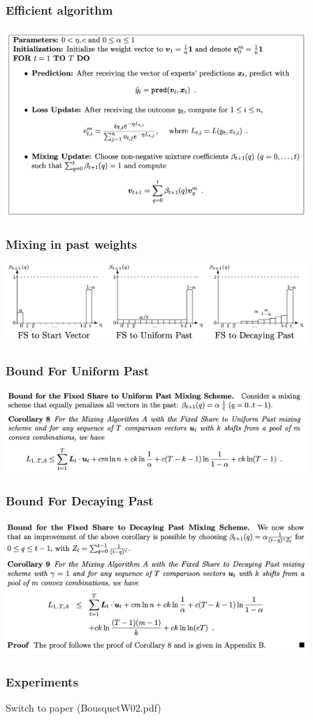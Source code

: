 \documentclass{beamer}
\begin{document}
\begin{frame}
\frametitle{Efficient algorithm}
\includegraphics[width=4.5in]{FromPaper/UpdateMixAlgorithm.png}
\end{frame}

\begin{frame}
\frametitle{Mixing in past weights}
\includegraphics[width=4.5in]{FromPaper/Mixingweights.png}
\end{frame}


\begin{frame}
\frametitle{Bound For Uniform Past}
\includegraphics[width=4.5in]{FromPaper/UniformPast.png}
\end{frame}

\begin{frame}
\frametitle{Bound For Decaying Past}
\includegraphics[width=4.5in]{FromPaper/DecayingPast.png}
\end{frame}

\begin{frame}
\frametitle{Experiments}
Switch to paper (BousquetW02.pdf)
\end{frame}


\endgroup
 %
\end{document}
